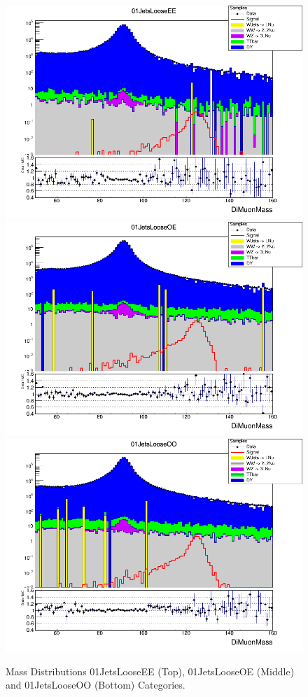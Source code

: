 \begin{figure}[H]
  \centering
  \includegraphics[width=0.65\linewidth]{figures/ch_higgs/distributions/baseline_kalman/distribution__01JetsLooseEE__DiMuonMass__logY.png}\\
  \includegraphics[width=0.65\linewidth]{figures/ch_higgs/distributions/baseline_kalman/distribution__01JetsLooseOE__DiMuonMass__logY.png}\\
  \includegraphics[width=0.65\linewidth]{figures/ch_higgs/distributions/baseline_kalman/distribution__01JetsLooseOO__DiMuonMass__logY.png}
  \caption{Mass Distributions 01JetsLooseEE (Top), 01JetsLooseOE (Middle) and 01JetsLooseOO (Bottom) Categories.}
  \label{fig:higgs_categorization_01jetslooseeeeooo}
\end{figure}

